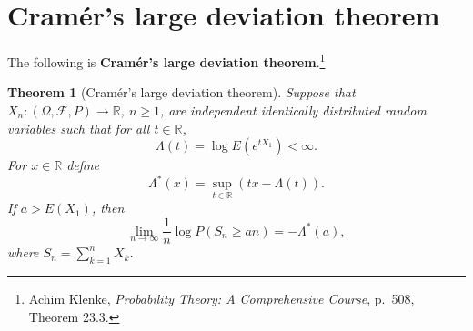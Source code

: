 \documentclass{article}
\newtheorem{theorem}{Theorem}
\theoremstyle{definition}
\begin{document}
\section{Cram\'er's large deviation theorem}

The following is \textbf{Cram\'er's large deviation theorem}.\footnote{Achim Klenke, {\em Probability Theory: A Comprehensive Course},
p.~508, Theorem 23.3.}


\begin{theorem}[Cram\'er's  large deviation theorem]
Suppose that $X_n:(\Omega,\mathscr{F},P) \to \mathbb{R}$, $n \geq 1$, are independent identically
distributed random variables such that for all $t \in \mathbb{R}$,
\[
\Lambda(t) = \log E(e^{tX_1})<\infty.
\]
For $x \in \mathbb{R}$ define
\[
\Lambda^*(x) = \sup_{t \in \mathbb{R}} (tx-\Lambda(t)).
\]
If $a>E(X_1)$, then
\[
\lim_{n \to \infty} \frac{1}{n} \log P(S_n \geq an) = -\Lambda^*(a),
\]
where $S_n = \sum_{k=1}^n X_k$. 
\end{theorem}
\end{document}
